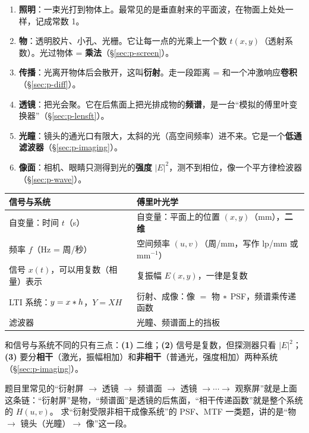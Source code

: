 \begin{enumerate}
\item \textbf{照明}：一束光打到物体上。最常见的是垂直射来的平面波，在物面上处处一样，记成常数 1。
\item \textbf{物}：透明胶片、小孔、光栅。它让每一点的光乘上一个数 $t(x,y)$（透射系数）。光过物体 = \textbf{乘法}（§\ref{sec:p-screen}）。
\item \textbf{传播}：光离开物体后会散开，这叫\textbf{衍射}。走一段距离 = 和一个冲激响应\textbf{卷积}（§\ref{sec:p-diff}）。
\item \textbf{透镜}：把光会聚。它在后焦面上把光排成物的\textbf{频谱}，是一台“模拟的傅里叶变换器”（§\ref{sec:p-lensft}）。
\item \textbf{光瞳}：镜头的通光口有限大，太斜的光（高空间频率）进不来。它是一个\textbf{低通滤波器}（§\ref{sec:p-imaging}）。
\item \textbf{像面}：相机、眼睛只测得到光的\textbf{强度} $|E|^2$，测不到相位，像一个平方律检波器（§\ref{sec:p-wave}）。
\end{enumerate}

\begin{idea}
\renewcommand{\arraystretch}{1.25}
\begin{tabular}{@{}P{5.6cm}P{10cm}@{}}
信号与系统 & 傅里叶光学\\ \hline
自变量：时间 $t$（s） & 自变量：平面上的位置 $(x,y)$（mm），\textbf{二维}\\
频率 $f$（Hz = 周/秒） & 空间频率 $(u,v)$（周/mm，写作 lp/mm 或 mm$^{-1}$）\\
信号 $x(t)$，可以用复数（相量）表示 & 复振幅 $E(x,y)$，一律是复数\\
LTI 系统：$y=x\ast h$，$Y=XH$ & 衍射、成像：像 $=$ 物 $\ast$ PSF，频谱乘传递函数\\
滤波器 & 光瞳、频谱面上的挡板\\
\end{tabular}

\smallskip
和信号与系统不同的只有三点：\textbf{(1)} 二维；\textbf{(2)} 信号是复数，但探测器只看 $|E|^2$；\textbf{(3)} 要分\textbf{相干}（激光，振幅相加）和\textbf{非相干}（普通光，强度相加）两种系统（§\ref{sec:p-imaging}）。
\end{idea}

\pkao 题目里常见的“衍射屏 $\to$ 透镜 $\to$ 频谱面 $\to$ 透镜 $\to\cdots\to$ 观察屏”就是上面这条链：“衍射屏”是物，“频谱面”是透镜的后焦面，“相干传递函数”就是整个系统的 $H(u,v)$。
求“衍射受限非相干成像系统”的 PSF、MTF 一类题，讲的是“物 $\to$ 镜头（光瞳）$\to$ 像”这一段。

